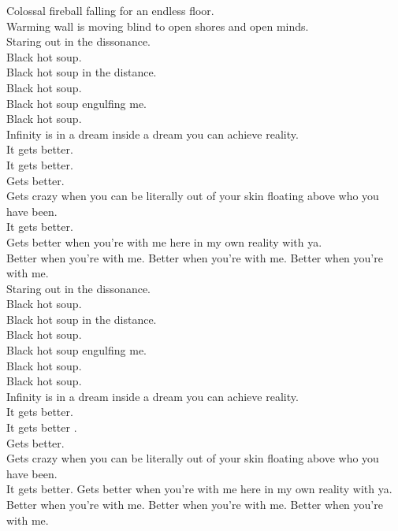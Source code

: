 Colossal fireball falling for an endless floor. \\
Warming wall is moving blind to open shores and open minds. \\

Staring out in the dissonance. \\
Black hot soup. \\
Black hot soup in the distance. \\
Black hot soup. \\
Black hot soup engulfing me. \\
Black hot soup. \\

Infinity is in a dream inside a dream you can achieve reality. \\
It gets better. \\
It gets better. \\
Gets better. \\
Gets crazy when you can be literally out of your skin floating above who you have been. \\
It gets better. \\
Gets better when you're with me here in my own reality with ya. \\
Better when you're with me. Better when you're with me. Better when you're with me. \\

Staring out in the dissonance. \\
Black hot soup. \\
Black hot soup in the distance. \\
Black hot soup. \\
Black hot soup engulfing me. \\
Black hot soup. \\

Black hot soup. \\

Infinity is in a dream inside a dream you can achieve reality. \\
It gets better. \\
It gets better .\\
Gets better. \\
Gets crazy when you can be literally out of your skin floating above who you have been. \\
It gets better. Gets better when you're with me here in my own reality with ya. \\
Better when you're with me. Better when you're with me. Better when you're with me. \\

